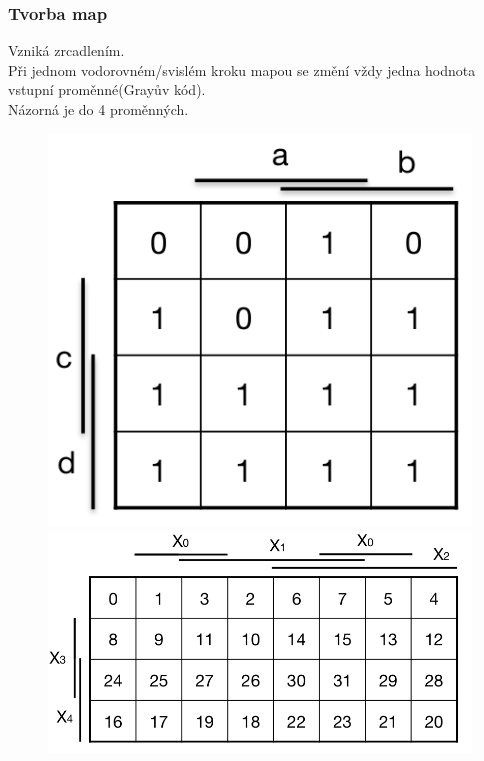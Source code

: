 \subsubsection{Tvorba map}
Vzniká zrcadlením. \\
Při jednom vodorovném/svislém kroku mapou se změní vždy jedna hodnota vstupní proměnné(Grayův kód).\\
Názorná je do 4 proměnných. \\
\newpage
\begin{figure}[h!]
    \centering
    \begin{minipage}[b]{0.4\textwidth}
        \includegraphics[width=\textwidth]{img/Mapa4.png}
    \end{minipage}
    \hfill
    \begin{minipage}[b]{0.4\textwidth}
        \includegraphics[width=\textwidth]{img/Mapa5.png}
    \end{minipage}
\end{figure}

